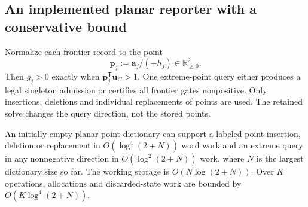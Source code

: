 \subsection{An implemented planar reporter with a conservative bound}

Normalize each frontier record to the point
\begin{equation}
 \bm p_j:=\bm a_j/(-h_j)\in\mathbb R^2_{\geq0}.
 \label{eq:op3-two-port-point}
\end{equation}
Then $g_j>0$ exactly when
$\bm p_j^{\mathsf T}\bm u_C>1$. One extreme-point query either produces
a legal singleton admission or certifies all frontier gates nonpositive.
Only insertions, deletions and individual replacements of points are used.
The retained solve changes the query direction, not the stored points.

\begin{lemma}
\label{lem:op3-avl-upper-hull}
An initially empty planar point dictionary can support a labeled point
insertion, deletion or replacement in $O(\log^4(2+N))$ word work and an
extreme query in any nonnegative direction in $O(\log^2(2+N))$ work,
where $N$ is the largest dictionary size so far. The working storage is
$O(N\log(2+N))$. Over $K$ operations, allocations and discarded-state
work are bounded by $O(K\log^4(2+N))$.
\end{lemma}
